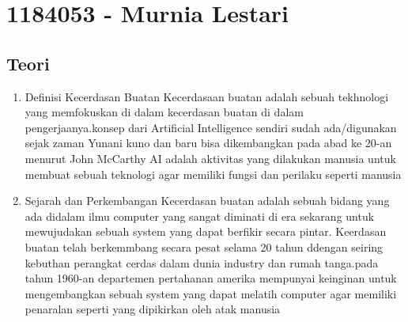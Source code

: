 \section{1184053 - Murnia Lestari}
\subsection{Teori}
\begin{enumerate}

	\item Definisi Kecerdasan Buatan
	\hfill\break
	Kecerdasaan buatan adalah sebuah tekhnologi yang memfokuskan di dalam kecerdasan buatan di dalam pengerjaanya.konsep dari Artificial Intelligence sendiri sudah ada/digunakan sejak zaman Yunani kuno dan baru bisa dikembangkan pada abad ke 20-an menurut John McCarthy AI adalah aktivitas yang dilakukan manusia untuk membuat sebuah teknologi agar memiliki fungsi dan perilaku seperti manusia


	\item Sejarah dan Perkembangan
	\hfill\break
Kecerdasan buatan adalah sebuah bidang yang ada didalam ilmu computer yang sangat diminati di era sekarang untuk mewujudakan sebuah system yang dapat berfikir secara pintar. Keerdasan buatan telah berkemmbang secara pesat selama 20 tahun ddengan seiring kebuthan perangkat cerdas dalam dunia industry dan rumah tanga.pada tahun 1960-an departemen pertahanan amerika mempunyai keinginan untuk mengembangkan sebuah system yang dapat melatih computer agar memiliki penaralan seperti yang dipikirkan oleh atak manusia 
	


\end{enumerate}

